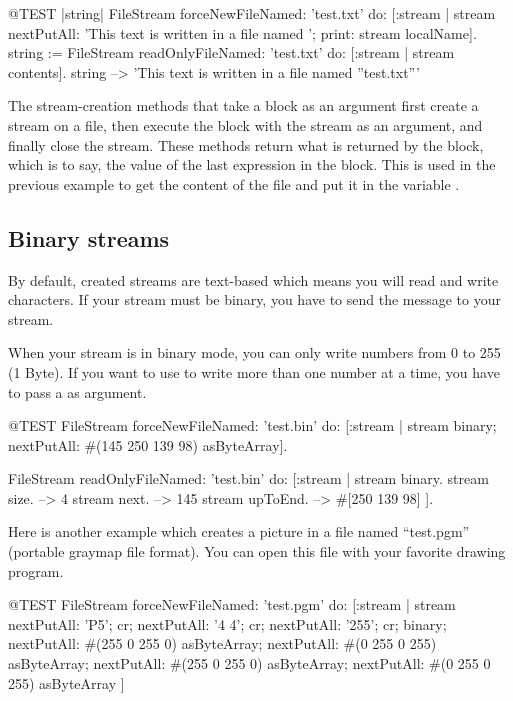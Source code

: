 \documentclass[a4paper,10pt,twoside]{book}
\begin{document}
{\begin{code}{@TEST |string|}
FileStream
    forceNewFileNamed: 'test.txt'
    do: [:stream |
        stream
            nextPutAll: 'This text is written in a file named ';
            print: stream localName].
string := FileStream
            readOnlyFileNamed: 'test.txt'
            do: [:stream | stream contents].
string --> 'This text is written in a file named ''test.txt'''
\end{code}

The stream-creation methods that take a block as an argument first
create a stream on a file, then execute the block with the stream
as an argument, and finally close the stream. These methods return what
is returned by the block, which is to say, the value of the last
expression in the block. This is used in the previous example to get
the content of the file and put it in the variable .

\subsection{Binary streams}

By default, created streams are text-based which means you will read
and write characters. If your stream must be binary, you have to send
the message  to your stream.

When your stream is in binary mode, you can only write numbers from 0
to 255 (1 Byte). If you want to use  to write more
than one number at a time, you have to pass a  as
argument.

\begin{code}{@TEST}
FileStream
  forceNewFileNamed: 'test.bin'
  do: [:stream |
          stream
            binary;
            nextPutAll: #(145 250 139 98) asByteArray].

FileStream
  readOnlyFileNamed: 'test.bin'
  do: [:stream |
          stream binary.
          stream size.         --> 4
          stream next.         --> 145
          stream upToEnd. --> #[250 139 98]
      ].
\end{code}

Here is another example which creates a picture in a file named
``test.pgm'' (portable graymap file format). You can open this file with your favorite drawing program.

\begin{code}{@TEST}
FileStream
  forceNewFileNamed: 'test.pgm' 
  do: [:stream |
	stream
		nextPutAll: 'P5'; cr;
		nextPutAll: '4 4'; cr;
		nextPutAll: '255'; cr;
		binary;
		nextPutAll: #(255 0 255 0) asByteArray;
		nextPutAll: #(0 255 0 255) asByteArray;
		nextPutAll: #(255 0 255 0) asByteArray;
		nextPutAll: #(0 255 0 255) asByteArray
	]
\end{code}

}
\end{document}

